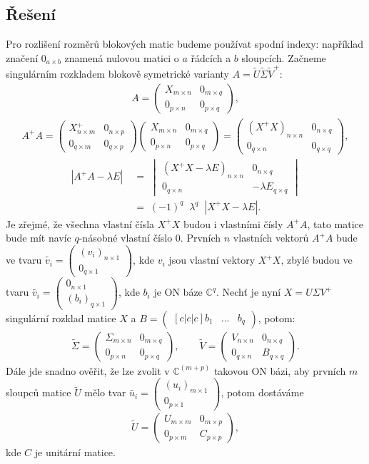 \documentclass[]{article}
\newcommand{\mat}[1]{\begin{pmatrix}#1\end{pmatrix}}
\newcommand{\x}{\times}
\begin{document}
\subsection{Řešení}
Pro rozlišení rozměrů blokových matic budeme používat spodní indexy: například značení $0_{a \x b}$ znamená nulovou matici o $a$ řádcích a $b$ sloupcích. Začneme singulárním rozkladem blokově symetrické varianty $A = \widetilde{U} \widetilde{\Sigma} \widetilde{V}^+$:
\begin{align*}
  A = \mat{
    X_{m \x n} & 0_{m \x q} \\
    0_{p \x n} & 0_{p \x q}
  },
\end{align*}
\begin{align*}
  A^+ A =
  \mat{
    X^+_{n \x m} & 0_{n \x p} \\
    0_{q \x m} & 0_{q \x p}
  }
  \mat{
    X_{m \x n} & 0_{m \x q} \\
    0_{p \x n} & 0_{p \x q}
  }
  =
  \mat{
    (X^+X)_{n \x n} & 0_{n \x q} \\
    0_{q \x n} & 0_{q \x q}
  },
\end{align*}
\begin{align*}
  |A^+A - \lambda E| \; &= \;
  \begin{vmatrix}
    (X^+X - \lambda E)_{n \x n} & 0_{n \x q} \\
    0_{q \x n} & -\lambda E_{q \x q}
  \end{vmatrix} \\
  \; &= \; (-1)^q \;\; \lambda^q \;\; |X^+X - \lambda E|.
\end{align*}
Je zřejmé, že všechna vlastní čísla $X^+X$ budou i vlastními čísly $A^+A$, tato matice bude mít navíc $q$-násobné vlastní číslo 0. Prvních $n$ vlastních vektorů $A^+A$ bude ve tvaru $\widetilde{v_i} = \mat{ (v_i)_{n \x 1} \\ 0_{q \x 1} }$, kde $v_i$ jsou vlastní vektory $X^+X$, zbylé budou ve tvaru $\widetilde{v_i} = \mat{ 0_{n \x 1} \\ (b_i)_{q \x 1}}$, kde $b_i$ je ON báze $\mathbb{C}^q$. Nechť je nyní $X = U \Sigma V^+$ singulární rozklad matice $X$ a $B = \begin{pmatrix}[c|c|c]
  b_1 & ... & b_q
\end{pmatrix}$, potom:
\begin{align*}
  \widetilde{\Sigma}
  = \mat{
    \Sigma_{m \x n} & 0_{m \x q} \\
    0_{p \x n} & 0_{p \x q}
  },
  \hspace{2em}
  \widetilde{V}
  = \mat{
    V_{n \x n} & 0_{n \x q} \\
    0_{q \x n} & B_{q \x q}
  }.
\end{align*}
Dále jde snadno ověřit, že lze zvolit v $\mathbb{C}^{(m+p)}$ takovou ON bázi, aby prvních $m$ sloupců matice $\widetilde{U}$ mělo tvar $\widetilde{u_i} = \mat{(u_i)_{m \x 1} \\ 0_{p \x 1}}$, potom dostáváme
\begin{align*}
  \widetilde{U} = \mat{
    U_{m \x m} & 0_{m \x p} \\
    0_{p \x m} & C_{p \x p}
  },
\end{align*}
kde $C$ je unitární matice.
\end{document}

